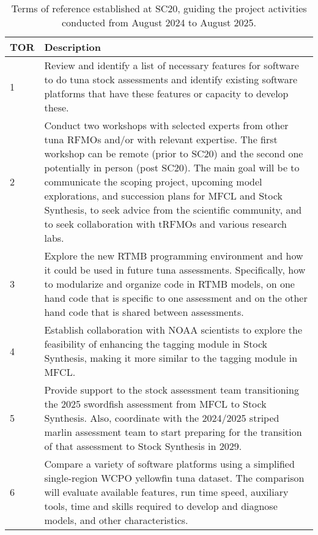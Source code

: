 \documentclass{SCreport}
\begin{document}
\begin{table}
  \renewcommand\arraystretch{1.25}
  \centering
  \captionsetup{width=0.90\textwidth}
  \caption{Terms of reference established at SC20, guiding the project
    activities conducted from August 2024 to August 2025.\label{tab:tors}}
  \vspace{1ex}
  \begin{tabular}{p{1cm}p{13cm}}
    \hline
    TOR & Description\\
    \hline
    1 & Review and identify a list of necessary features for software to do tuna
        stock assessments and identify existing software platforms that have
        these features or capacity to develop these.\\
    \hline
    2 & Conduct two workshops with selected experts from other tuna RFMOs and/or
        with relevant expertise. The first workshop can be remote (prior to
        SC20) and the second one potentially in person (post SC20). The main
        goal will be to communicate the scoping project, upcoming model
        explorations, and succession plans for MFCL and Stock Synthesis, to seek
        advice from the scientific community, and to seek collaboration with
        tRFMOs and various research labs.\\
    \hline
    3 & Explore the new RTMB programming environment and how it could be used in
        future tuna assessments. Specifically, how to modularize and organize
        code in RTMB models, on one hand code that is specific to one assessment
        and on the other hand code that is shared between assessments.\\
    \hline
    4 & Establish collaboration with NOAA scientists to explore the feasibility
        of enhancing the tagging module in Stock Synthesis, making it more
        similar to the tagging module in MFCL.\\
    \hline
    5 & Provide support to the stock assessment team transitioning the 2025
        swordfish assessment from MFCL to Stock Synthesis. Also, coordinate with
        the 2024/2025 striped marlin assessment team to start preparing for the
        transition of that assessment to Stock Synthesis in 2029.\\
    \hline
    6 & Compare a variety of software platforms using a simplified single-region
        WCPO yellowfin tuna dataset. The comparison will evaluate available
        features, run time speed, auxiliary tools, time and skills required to
        develop and diagnose models, and other characteristics.\\

\end{tabular}
\end{table}
\end{document}

